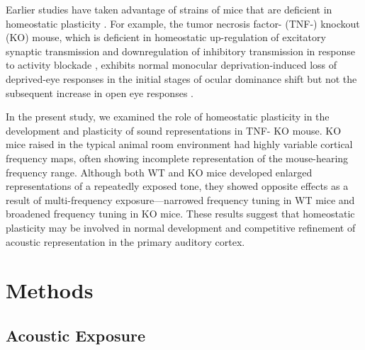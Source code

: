 Earlier studies have taken advantage of strains of mice that are deficient in homeostatic plasticity \cite{Kaneko2008, Ranson2012}. For example, the tumor necrosis factor-\textalpha{} (TNF-\textalpha{}) knockout (KO) mouse, which is deficient in homeostatic up-regulation of excitatory synaptic transmission and downregulation of inhibitory transmission in response to activity blockade \cite{Stellwagen2006, Kaneko2008}, exhibits normal monocular deprivation-induced loss of deprived-eye responses in the initial stages of ocular dominance shift but not the subsequent increase in open eye responses \cite{Kaneko2008}.

In the present study, we examined the role of homeostatic plasticity in the development and plasticity of sound representations in TNF-\textalpha{} KO mouse. KO mice raised in the typical animal room environment had highly variable cortical frequency maps, often showing incomplete representation of the mouse-hearing frequency range. Although both WT and KO mice developed enlarged representations of a repeatedly exposed tone, they showed opposite effects as a result of multi-frequency exposure---narrowed frequency tuning in WT mice and broadened frequency tuning in KO mice. These results suggest that homeostatic plasticity may be involved in normal development and competitive refinement of acoustic representation in the primary auditory cortex.

\section{Methods}

\subsection{Acoustic Exposure}

